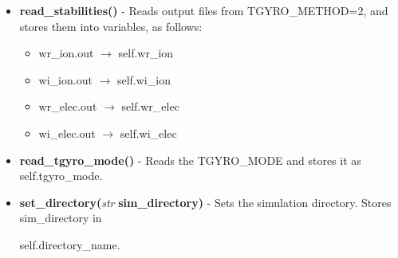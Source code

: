 \documentclass{article}
\begin{document}
\begin{itemize}
\begin{itemize}
\item \textbf{read\_stabilities()} - Reads output files from TGYRO\_METHOD=2, and stores them into variables, as follows:
\begin{itemize}
\item wr\_ion.out $\rightarrow$ self.wr\_ion
\item wi\_ion.out $\rightarrow$ self.wi\_ion
\item wr\_elec.out $\rightarrow$ self.wr\_elec
\item wi\_elec.out $\rightarrow$ self.wi\_elec
\end{itemize}
\item \textbf{read\_tgyro\_mode()} - Reads the TGYRO\_MODE and stores it as self.tgyro\_mode.
\item \textbf{set\_directory(}\emph{str}\textbf{ sim\_directory)} - Sets the simulation directory.  Stores sim\_directory in 

self.directory\_name.
\end{itemize}
\end{itemize}
\end{document}
